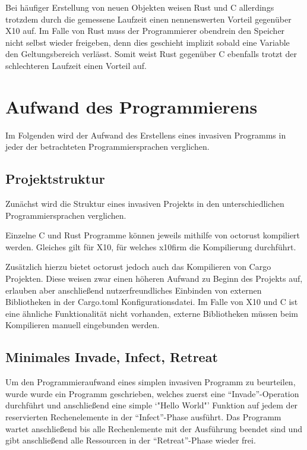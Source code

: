 Bei häufiger Erstellung von neuen Objekten weisen Rust und C allerdings trotzdem durch die gemessene Laufzeit
einen nennenswerten Vorteil gegenüber X10 auf. Im Falle von Rust muss der Programmierer obendrein
den Speicher nicht selbst wieder freigeben, denn dies geschieht implizit sobald eine Variable
den Geltungsbereich verlässt. Somit weist Rust gegenüber C ebenfalls trotzt der schlechteren Laufzeit
einen Vorteil auf.

\section{Aufwand des Programmierens}

Im Folgenden wird der Aufwand des Erstellens eines invasiven Programms in jeder der betrachteten
Programmiersprachen verglichen.

\subsection{Projektstruktur}

Zunächst wird die Struktur eines invasiven Projekts in den unterschiedlichen Programmiersprachen verglichen.

Einzelne C und Rust Programme können jeweils mithilfe von octorust kompiliert werden. Gleiches gilt für X10, für
welches x10firm die Kompilierung durchführt.

Zusätzlich hierzu bietet octorust jedoch auch das Kompilieren von Cargo Projekten. Diese weisen zwar einen
höheren Aufwand zu Beginn des Projekts auf, erlauben aber anschließend nutzerfreundliches Einbinden von
externen Bibliotheken in der Cargo.toml Konfigurationsdatei. Im Falle von X10 und C ist eine ähnliche
Funktionalität nicht vorhanden, externe Bibliotheken müssen beim Kompilieren manuell eingebunden werden.

\subsection{Minimales Invade, Infect, Retreat}

Um den Programmieraufwand eines simplen invasiven Programm zu beurteilen, wurde wurde ein Programm geschrieben, 
welches zuerst eine "`Invade"'-Operation durchführt und anschließend eine simple `"Hello World"'
Funktion auf jedem der reservierten Rechenelemente in der "`Infect"'-Phase ausführt.
Das Programm wartet anschließend bis alle Rechenlemente mit der Ausführung beendet sind und gibt anschließend
alle Ressourcen in der "`Retreat"'-Phase wieder frei.

